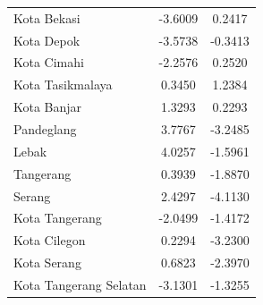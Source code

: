\begin{longtable}{|l|c|c|}
Kota Bekasi & -3.6009 & 0.2417 \\
Kota Depok & -3.5738 & -0.3413 \\
Kota Cimahi & -2.2576 & 0.2520 \\
Kota Tasikmalaya & 0.3450 & 1.2384 \\
Kota Banjar & 1.3293 & 0.2293 \\
Pandeglang & 3.7767 & -3.2485 \\
Lebak & 4.0257 & -1.5961 \\
Tangerang & 0.3939 & -1.8870 \\
Serang & 2.4297 & -4.1130 \\
Kota Tangerang & -2.0499 & -1.4172 \\
Kota Cilegon & 0.2294 & -3.2300 \\
Kota Serang & 0.6823 & -2.3970 \\
Kota Tangerang Selatan & -3.1301 & -1.3255 \\
\hline
\end{longtable}
\vspace{0.5cm}